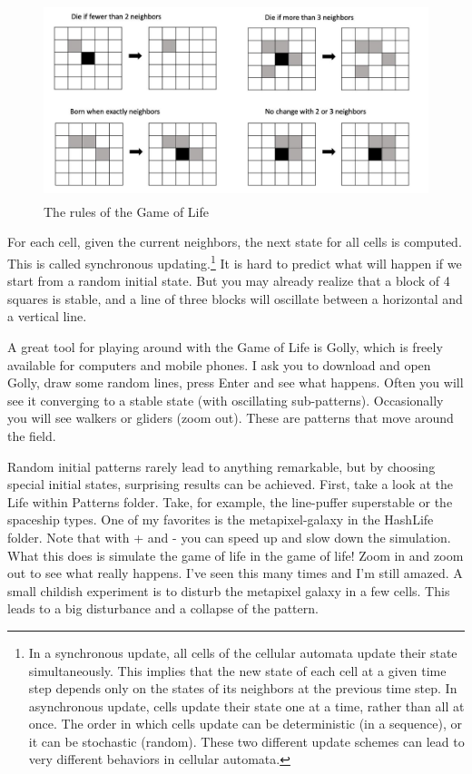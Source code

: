 \documentclass[
  letterpaper,
]{scrbook}
\begin{document}
\begin{figure}

{\centering \includegraphics[width=4.6891in,height=2.26241in]{media/ch4/image3.jpg}

}

\caption{\label{fig-ch4-img3}The rules of the Game of Life}

\end{figure}

For each cell, given the current neighbors, the next state for all cells
is computed. This is called synchronous updating.\footnote{In a
  synchronous update, all cells of the cellular automata update their
  state simultaneously. This implies that the new state of each cell at
  a given time step depends only on the states of its neighbors at the
  previous time step. In asynchronous update, cells update their state
  one at a time, rather than all at once. The order in which cells
  update can be deterministic (in a sequence), or it can be stochastic
  (random). These two different update schemes can lead to very
  different behaviors in cellular automata.} It is hard to predict what
will happen if we start from a random initial state. But you may already
realize that a block of 4 squares is stable, and a line of three blocks
will oscillate between a horizontal and a vertical line.

A great tool for playing around with the Game of Life is Golly, which is
freely available for computers and mobile phones. I ask you to download
and open Golly, draw some random lines, press Enter and see what
happens. Often you will see it converging to a stable state (with
oscillating sub-patterns). Occasionally you will see walkers or gliders
(zoom out). These are patterns that move around the field.

Random initial patterns rarely lead to anything remarkable, but by
choosing special initial states, surprising results can be achieved.
First, take a look at the Life within Patterns folder. Take, for
example, the line-puffer superstable or the spaceship types. One of my
favorites is the metapixel-galaxy in the HashLife folder. Note that with
+ and - you can speed up and slow down the simulation. What this does is
simulate the game of life in the game of life! Zoom in and zoom out to
see what really happens. I've seen this many times and I'm still amazed.
A small childish experiment is to disturb the metapixel galaxy in a few
cells. This leads to a big disturbance and a collapse of the pattern.
\end{document}

